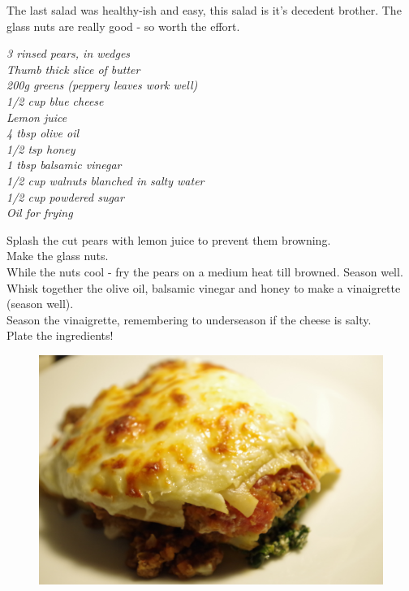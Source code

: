 \documentclass{tufte-book}
\begin{document}
The last salad was healthy-ish and easy, this salad is it's decedent brother. The glass nuts are really good - so worth the effort.

\smallskip
\emph{3 rinsed pears, in wedges
\\Thumb thick slice of butter
\\200g greens (peppery leaves work well)
\\1/2 cup blue cheese
\\Lemon juice
\\4 tbsp olive oil
\\1/2 tsp honey
\\1 tbsp balsamic vinegar
\\1/2 cup walnuts blanched in salty water
\\1/2 cup powdered sugar
\\Oil for frying
}

\smallskip
Splash the cut pears with lemon juice to prevent them browning.
\\Make the glass nuts.
\\While the nuts cool - fry the pears on a medium heat till browned. Season well.
\\Whisk together the olive oil, balsamic vinegar and honey to make a vinaigrette (season well).
\\Season the vinaigrette, remembering to underseason if the cheese is salty.
\\Plate the ingredients!

\newpage

\begin{figure}[h]
  \includegraphics[width=\linewidth]{lasagne.jpg}%
\end{figure}
\end{document}
